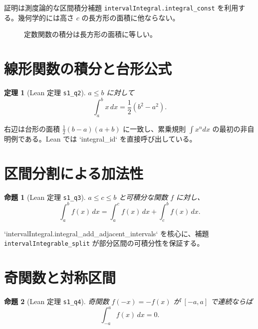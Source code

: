 \documentclass[luatex]{ltjsarticle}
\theoremstyle{definition}
\theoremstyle{plain}
\newtheorem{theorem}{定理}
\newtheorem{proposition}{命題}
\theoremstyle{remark}
\begin{document}
証明は測度論的な区間積分補題 \texttt{intervalIntegral.integral\_const} を利用する。幾何学的には高さ \(c\) の長方形の面積に他ならない。

\begin{figure}[h]
\centering
{}
\caption{定数関数の積分は長方形の面積に等しい。}
\end{figure}

\section{線形関数の積分と台形公式}

\begin{theorem}[Lean 定理 \texttt{s1\_q2}]
\label{thm:s1q2}
\(a\le b\) に対して
\[
\int_a^b x\,dx = \frac{1}{2}(b^2-a^2).
\]
\end{theorem}

右辺は台形の面積 \(\tfrac{1}{2}(b-a)(a+b)\) に一致し、累乗規則 \(\int x^n dx\) の最初の非自明例である。Lean では `integral_id` を直接呼び出している。

\section{区間分割による加法性}
\begin{proposition}[Lean 定理 \texttt{s1\_q3}]
\label{prop:s1q3}
\(a\le c\le b\) と可積分な関数 \(f\) に対し、
\[
\int_a^b f(x)\,dx = \int_a^c f(x)\,dx + \int_c^b f(x)\,dx.
\]
\end{proposition}

`intervalIntegral.integral_add_adjacent_intervals` を核心に、補題 \texttt{intervalIntegrable\_split} が部分区間の可積分性を保証する。

\section{奇関数と対称区間}
\begin{proposition}[Lean 定理 \texttt{s1\_q4}]
\label{prop:s1q4}
奇関数 \(f(-x)=-f(x)\) が \([-a,a]\) で連続ならば
\[
\int_{-a}^{a} f(x)\,dx = 0.
\]
\end{proposition}
\end{document}
